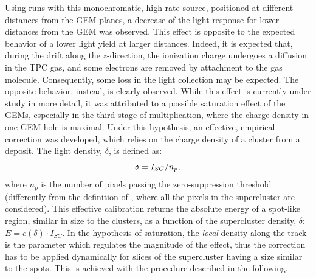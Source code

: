 Using runs with this monochromatic, high rate source, positioned at
different distances from the GEM planes, a decrease of the light
response for lower distances from the GEM was observed. This effect is
opposite to the expected behavior of a lower light yield at larger
distances. Indeed, it is expected that, during the drift along the
$z$-direction, the ionization charge undergoes a diffusion in the TPC
gas, and some electrons are removed by attachment to the gas molecule.
Consequently, some loss in the light collection may be expected. The
opposite behavior, instead, is clearly observed. While this effect is
currently under study in more detail, it was attributed to a possible
saturation effect of the GEMs, especially in the third stage of
multiplication, where the charge density in one GEM hole is
maximal.  Under this hypothesis, an effective, empirical correction
was developed, which relies on the charge density of a cluster from
a \fe deposit. The light density, $\delta$, is defined as:
\begin{equation}
  \label{eq:density}
  \delta = I_{SC} / n_p,
\end{equation}
where $n_p$ is the number of pixels passing the zero-suppression
threshold (differently from the definition of \isclu, where all the
pixels in the supercluster are considered). This effective calibration
returns the absolute energy of a spot-like region, similar in size to
the \fe clusters, as a function of the supercluster density, $\delta$:
$E=c(\delta)\cdot I_{SC}$. In the hypothesis of saturation, the
\textit{local} density along the track is the parameter which
regulates the magnitude of the effect, thus the correction has to be
applied dynamically for slices of the supercluster having a size
similar to the \fe spots.  This is achieved with the procedure
described in the following.


